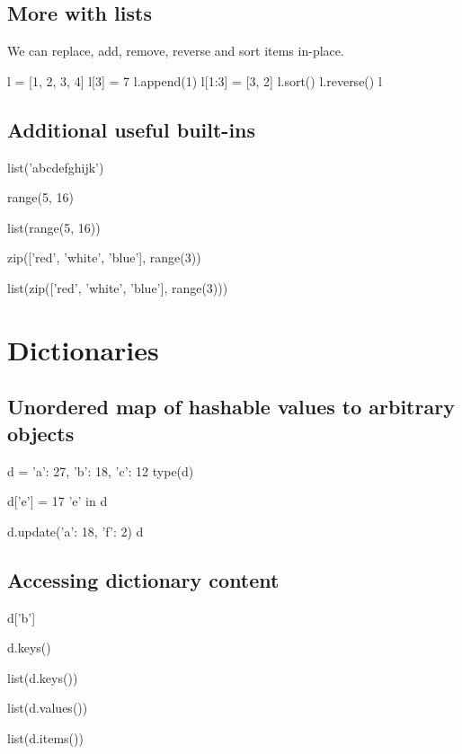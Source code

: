 \documentclass[aspectratio=1610,slidestop]{beamer}
\begin{document}
\subsection{More with lists}
\begin{pframe}
 We can replace, add, remove, reverse and sort items in-place.
\begin{pyconsole}
l = [1, 2, 3, 4]
l[3] = 7
l.append(1)
l[1:3] = [3, 2]
l.sort()
l.reverse()
l
\end{pyconsole}
\end{pframe}


\subsection{Additional useful built-ins}
\begin{pframe}
\vspace{-0.25cm}
\begin{pyconsole}
list('abcdefghijk')

range(5, 16)

list(range(5, 16))

zip(['red', 'white', 'blue'], range(3))

list(zip(['red', 'white', 'blue'], range(3)))
\end{pyconsole}
\end{pframe}


\section{Dictionaries}
\makeTableOfContentsSection

\subsection{Unordered map of hashable values to arbitrary objects}
\begin{pframe}
\begin{pyconsole}
d = {'a': 27, 'b': 18, 'c': 12}
type(d)

d['e'] = 17
'e' in d

d.update({'a': 18, 'f': 2})
d
\end{pyconsole}
\end{pframe}


\subsection{Accessing dictionary content}
\begin{pframe}
\vspace{-0.25cm}
\begin{pyconsole}
d['b']

d.keys()

list(d.keys())

list(d.values())

list(d.items())
\end{pyconsole}
\end{pframe}
\end{document}
